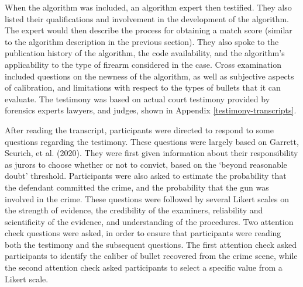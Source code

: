 \documentclass[print]{nuthesis}
\begin{document}
When the algorithm was included, an algorithm expert then testified.
They also listed their qualifications and involvement in the development of the algorithm.
The expert would then describe the process for obtaining a match score (similar to the algorithm description in the previous section).
They also spoke to the publication history of the algorithm, the code availability, and the algorithm's applicability to the type of firearm considered in the case.
Cross examination included questions on the newness of the algorithm, as well as subjective aspects of calibration, and limitations with respect to the types of bullets that it can evaluate.
The testimony was based on actual court testimony provided by forensics experts lawyers, and judges, shown in Appendix \ref{testimony-transcripts}.

After reading the transcript, participants were directed to respond to some questions regarding the testimony.
These questions were largely based on Garrett, Scurich, et al. (2020).
They were first given information about their responsibility as jurors to choose whether or not to convict, based on the `beyond reasonable doubt' threshold.
Participants were also asked to estimate the probability that the defendant committed the crime, and the probability that the gun was involved in the crime.
These questions were followed by several Likert scales on the strength of evidence, the credibility of the examiners, reliability and scientificity of the evidence, and understanding of the procedures.
Two attention check questions were asked, in order to ensure that participants were reading both the testimony and the subsequent questions.
The first attention check asked participants to identify the caliber of bullet recovered from the crime scene, while the second attention check asked participants to select a specific value from a Likert scale.
\end{document}
